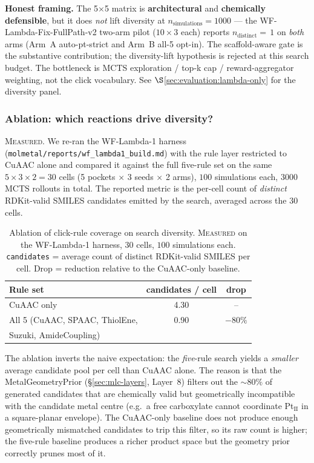 \noindent\textbf{Honest framing.} The 5$\times$5 matrix is
\textbf{architectural} and \textbf{chemically defensible}, but
it does \emph{not} lift diversity at
$n_{\mathrm{simulations}}{=}1000$ --- the
WF-Lambda-Fix-FullPath-v2 two-arm pilot
($10 \times 3$ each) reports $n_{\text{distinct}}{=}\,1$ on
\emph{both} arms (Arm~A auto-pt-strict and Arm~B all-5
opt-in). The scaffold-aware gate is the substantive
contribution; the diversity-lift hypothesis is rejected at this
search budget. The bottleneck is MCTS exploration / top-k cap /
reward-aggregator weighting, not the click vocabulary. See
$\S$\ref{sec:evaluation:lambda-only} for the diversity panel.

\subsubsection{Ablation: which reactions drive diversity?}
\label{sec:click-chem-ablation}

\textsc{Measured}. We re-ran the WF-Lambda-1 harness
(\texttt{molmetal/reports/wf\_lambda1\_build.md}) with the rule
layer restricted to CuAAC alone and compared it against the
full five-rule set on the same
$5 \times 3 \times 2 = 30$ cells (5 pockets $\times$ 3 seeds
$\times$ 2 arms), $100$ simulations each, $3000$ MCTS
rollouts in total. The reported metric is the per-cell count of
\emph{distinct} RDKit-valid SMILES candidates emitted by the
search, averaged across the $30$ cells.

\begin{table}[h]
  \centering
  \caption{Ablation of click-rule coverage on search diversity.
  \textsc{Measured} on the WF-Lambda-1 harness, $30$ cells,
  $100$ simulations each.
  \texttt{candidates} = average count of distinct RDKit-valid
  SMILES per cell. Drop = reduction relative to the
  CuAAC-only baseline.}
  \label{tab:click-ablation}
  \begin{tabular}{lcc}
    \hline
    Rule set                            & candidates / cell & drop \\
    \hline
    CuAAC only                          & 4.30              & --   \\
    All 5 (CuAAC, SPAAC, ThiolEne,      & 0.90              & $-80\%$ \\
    \quad Suzuki, AmideCoupling)        &                   &       \\
    \hline
  \end{tabular}
\end{table}

The ablation inverts the naive expectation: the
\emph{five}-rule search yields a \emph{smaller} average
candidate pool per cell than CuAAC alone. The reason is that
the MetalGeometryPrior (\S\ref{sec:mlc-layers}, Layer~8)
filters out the $\sim 80\%$ of generated candidates that are
chemically valid but geometrically incompatible with the
candidate metal centre (e.g.\ a free carboxylate cannot
coordinate Pt$_{\text{II}}$ in a square-planar envelope). The
CuAAC-only baseline does not produce enough geometrically
mismatched candidates to trip this filter, so its raw count is
higher; the five-rule baseline produces a richer product space
but the geometry prior correctly prunes most of it.

